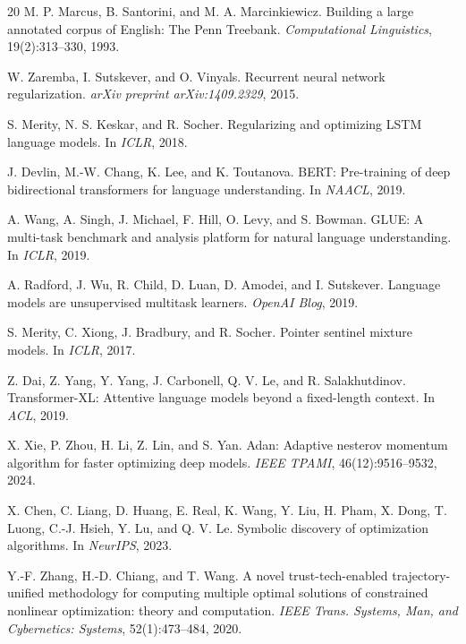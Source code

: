 \documentclass[10pt,twocolumn]{article}
\begin{document}
\begin{thebibliography}{20}
M. P. Marcus, B. Santorini, and M. A. Marcinkiewicz.
Building a large annotated corpus of English: The Penn Treebank.
\textit{Computational Linguistics}, 19(2):313--330, 1993.

W. Zaremba, I. Sutskever, and O. Vinyals.
Recurrent neural network regularization.
\textit{arXiv preprint arXiv:1409.2329}, 2015.

S. Merity, N. S. Keskar, and R. Socher.
Regularizing and optimizing LSTM language models.
In \textit{ICLR}, 2018.

J. Devlin, M.-W. Chang, K. Lee, and K. Toutanova.
BERT: Pre-training of deep bidirectional transformers for language understanding.
In \textit{NAACL}, 2019.

A. Wang, A. Singh, J. Michael, F. Hill, O. Levy, and S. Bowman.
GLUE: A multi-task benchmark and analysis platform for natural language understanding.
In \textit{ICLR}, 2019.

A. Radford, J. Wu, R. Child, D. Luan, D. Amodei, and I. Sutskever.
Language models are unsupervised multitask learners.
\textit{OpenAI Blog}, 2019.

S. Merity, C. Xiong, J. Bradbury, and R. Socher.
Pointer sentinel mixture models.
In \textit{ICLR}, 2017.

Z. Dai, Z. Yang, Y. Yang, J. Carbonell, Q. V. Le, and R. Salakhutdinov.
Transformer-XL: Attentive language models beyond a fixed-length context.
In \textit{ACL}, 2019.

X. Xie, P. Zhou, H. Li, Z. Lin, and S. Yan.
Adan: Adaptive nesterov momentum algorithm for faster optimizing deep models.
\textit{IEEE TPAMI}, 46(12):9516--9532, 2024.

X. Chen, C. Liang, D. Huang, E. Real, K. Wang, Y. Liu, H. Pham, X. Dong, T. Luong, C.-J. Hsieh, Y. Lu, and Q. V. Le.
Symbolic discovery of optimization algorithms.
In \textit{NeurIPS}, 2023.

Y.-F. Zhang, H.-D. Chiang, and T. Wang.
A novel trust-tech-enabled trajectory-unified methodology for computing multiple optimal solutions of constrained nonlinear optimization: theory and computation.
\textit{IEEE Trans. Systems, Man, and Cybernetics: Systems}, 52(1):473--484, 2020.

\end{thebibliography}
\end{document}

